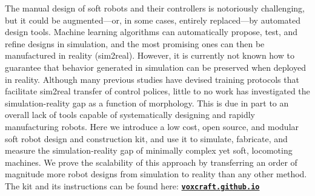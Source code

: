 % 
% 
\noindent
The manual design of soft robots and their controllers is notoriously challenging, but it could be augmented---or, in some cases, entirely replaced---by automated design tools. 
Machine learning algorithms can automatically propose, test, and refine designs in simulation, and the most promising ones can then be manufactured in reality (sim2real).
However, it is currently not known how to guarantee that behavior generated in simulation can be preserved when deployed in reality.
Although many previous studies have devised training protocols that facilitate sim2real transfer of control polices, little to no work has investigated the simulation-reality gap as a function of morphology.
This is due in part to an overall lack of tools capable of systematically designing and rapidly manufacturing robots.
Here we introduce a low cost, open source, and modular soft robot design and construction kit, and use it to simulate, fabricate, and measure the simulation-reality gap of minimally complex yet soft, locomoting machines.
We prove the scalability of this approach by transferring an order of magnitude more robot designs from simulation to reality than any other method. 
The kit and its instructions can be found here:
\href{https://voxcraft.github.io/}{\textbf{\texttt{voxcraft.github.io}}}
% 



